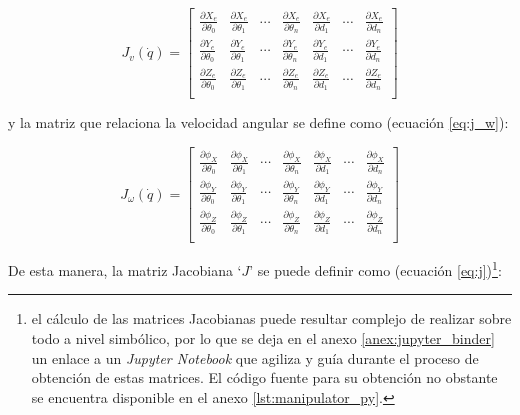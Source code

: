 \begin{equation}\label{eq:j_v}
    J_v\left(\dot{q}\right) =
    \begin{bmatrix}
        \frac{\partial X_e}{\partial \theta_0} & \frac{\partial X_e}{\partial \theta_1} & \cdots & \frac{\partial X_e}{\partial \theta_n} & \frac{\partial X_e}{\partial d_1} & \cdots & \frac{\partial X_e}{\partial d_n} \\[3ex]
        \frac{\partial Y_e}{\partial \theta_0} & \frac{\partial Y_e}{\partial \theta_1} & \cdots & \frac{\partial Y_e}{\partial \theta_n} & \frac{\partial Y_e}{\partial d_1} & \cdots & \frac{\partial Y_e}{\partial d_n} \\[3ex]
        \frac{\partial Z_e}{\partial \theta_0} & \frac{\partial Z_e}{\partial \theta_1} & \cdots & \frac{\partial Z_e}{\partial \theta_n} & \frac{\partial Z_e}{\partial d_1} & \cdots & \frac{\partial Z_e}{\partial d_n} \\
    \end{bmatrix}
\end{equation}

y la matriz que relaciona la velocidad angular se define como (ecuación \ref{eq:j_w}):

\begin{equation}\label{eq:j_w}
    J_{\omega}\left(\dot{q}\right) =
    \begin{bmatrix}
        \frac{\partial \phi_X}{\partial \theta_0} & \frac{\partial \phi_X}{\partial \theta_1} & \cdots & \frac{\partial \phi_X}{\partial \theta_n} & \frac{\partial \phi_X}{\partial d_1} & \cdots & \frac{\partial \phi_X}{\partial d_n} \\[3ex]
        \frac{\partial \phi_Y}{\partial \theta_0} & \frac{\partial \phi_Y}{\partial \theta_1} & \cdots & \frac{\partial \phi_Y}{\partial \theta_n} & \frac{\partial \phi_Y}{\partial d_1} & \cdots & \frac{\partial \phi_Y}{\partial d_n} \\[3ex]
        \frac{\partial \phi_Z}{\partial \theta_0} & \frac{\partial \phi_Z}{\partial \theta_1} & \cdots & \frac{\partial \phi_Z}{\partial \theta_n} & \frac{\partial \phi_Z}{\partial d_1} & \cdots & \frac{\partial \phi_Z}{\partial d_n} \\
    \end{bmatrix}
\end{equation}

De esta manera, la matriz Jacobiana `$J$' se puede definir como
(ecuación \ref{eq:j})\footnote{el cálculo de las matrices Jacobianas puede resultar
    complejo de realizar sobre todo a nivel simbólico, por lo que se deja en el anexo
    \ref{anex:jupyter_binder} un enlace a un \textit{Jupyter Notebook} que agiliza y guía
    durante el proceso de obtención de estas matrices. El código fuente para su obtención
    no obstante se encuentra disponible en el anexo \ref{lst:manipulator_py}.}:

